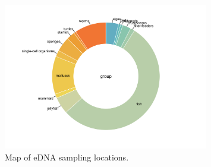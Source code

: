 \documentclass[10pt]{article}
\begin{document}
\begin{figure}[h]
\centering
\includegraphics[width=0.8\textwidth]{donut.png}
\caption{Map of eDNA sampling locations.}
\end{figure}





\clearpage

\begin{landscape}

\end{landscape}

\clearpage

\end{document}

